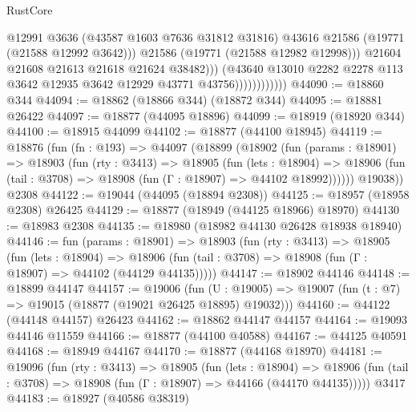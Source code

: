 \begin{lexlean}{RustCore}
\begin{coremodule}
                                    @12991
                                    @3636
                                    (@43587 @1603 @7636 @31812 @31816)
                                    @43616
                                    @21586
                                    (@19771 (@21588 @12992 @3642)))
                                  @21586
                                  (@19771 (@21588 @12982 @12998)))
                                @21604
                                @21608
                                @21613
                                @21618
                                @21624
                                @38482)))
                          (@43640
                            @13010
                            @2282
                            @2278
                            @113
                            @3642
                            @12935
                            @3642
                            @12929
                            @43771
                            @43756))))))))))))
@44090 := @18860 @344
@44094 := @18862 (@18866 @344) (@18872 @344)
@44095 := @18881 @26422
@44097 := @18877 (@44095 @18896)
@44099 := @18919 (@18920 @344)
@44100 := @18915 @44099
@44102 := @18877 (@44100 @18945)
@44119 := @18876
    (fun (fn : @193) =>
    @44097
      (@18899
        (@18902
          (fun (params : @18901) =>
          @18903
            (fun (rty : @3413) =>
            @18905
              (fun (lets : @18904) =>
              @18906 (fun (tail : @3708) => @18908 (fun (Γ : @18907) => @44102 @18992))))))
        @19038))
    @2308
@44122 := @19044 (@44095 (@18894 @2308))
@44125 := @18957 (@18958 @2308) @26425
@44129 := @18877 (@18949 (@44125 @18966) @18970)
@44130 := @18983 @2308
@44135 := @18980 (@18982 @44130 @26428 @18938 @18940)
@44146 := fun (params : @18901) =>
  @18903
    (fun (rty : @3413) =>
    @18905
      (fun (lets : @18904) =>
      @18906 (fun (tail : @3708) => @18908 (fun (Γ : @18907) => @44102 (@44129 @44135)))))
@44147 := @18902 @44146
@44148 := @18899 @44147
@44157 := @19006
    (fun (U : @19005) => @19007 (fun (t : @7) => @19015 (@18877 (@19021 @26425 @18895) @19032)))
@44160 := @44122 (@44148 @44157) @26423
@44162 := @18862 @44147 @44157
@44164 := @19093 @44146 @11559
@44166 := @18877 (@44100 @40588)
@44167 := @44125 @40591
@44168 := @18949 @44167
@44170 := @18877 (@44168 @18970)
@44181 := @19096
    (fun (rty : @3413) =>
    @18905
      (fun (lets : @18904) =>
      @18906 (fun (tail : @3708) => @18908 (fun (Γ : @18907) => @44166 (@44170 @44135)))))
    @3417
@44183 := @18927 (@40586 @38319)

\end{coremodule}
\end{lexlean}
